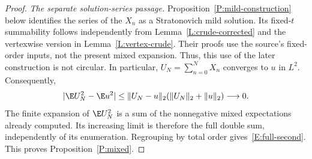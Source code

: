 \begin{proof}
\emph{The separate solution-series passage.}
Proposition~\ref{P:mild-construction} below identifies the series
of the $X_n$ as a Stratonovich mild solution. Its fixed-$t$ summability
follows independently from Lemma~\ref{L:crude-corrected} and the
vertexwise version in Lemma~\ref{L:vertex-crude}. Their proofs use
the source's fixed-order inputs, not the present mixed expansion.
Thus, this use of the later construction is not circular.
In particular, $U_N=\sum_{n=0}^N X_n$ converges to $u$ in $L^2$.
Consequently,
\[
  |\E U_N^2-\E u^2|
  \le\|U_N-u\|_2(\|U_N\|_2+\|u\|_2)\longrightarrow0.
\]
The finite expansion of $\E U_N^2$ is a sum of the nonnegative mixed
expectations already computed. Its increasing limit is therefore the
full double sum, independently of its enumeration. Regrouping by total
order gives~\eqref{E:full-second}. This proves Proposition~\ref{P:mixed}.
\end{proof}
